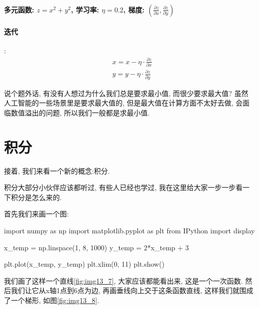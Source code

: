 \paragraph{多元函数: $z = x^2 + y ^2$, 学习率: $\eta = 0.2$, 梯度: $(\frac{\partial z}{\partial x}, \frac{\partial z}{\partial y})$}
\paragraph{迭代}:
\begin{align*}
  & x = x - \eta \cdot \frac{\partial z}{\partial x} \\
  & y = y - \eta \cdot \frac {\partial z}{\partial y}
\end{align*}

说个题外话, 有没有人想过为什么我们总是要求最小值, 而很少要求最大值? 虽然人工智能的一些场景里是要求最大值的, 但是最大值在计算方面不太好去做, 会面临数值溢出的问题, 所以我们一般都是求最小值. 

\section{积分}

接着, 我们来看一个新的概念:积分. 

积分大部分小伙伴应该都听过, 有些人已经也学过, 我在这里给大家一步一步看一下积分是怎么来的. 

首先我们来画一个图:

\begin{python}
import numpy as np
import matplotlib.pyplot as plt
from IPython import display

x_temp = np.linspace(1, 8, 1000)
y_temp = 2*x_temp + 3


plt.plot(x_temp, y_temp)
plt.xlim(0, 11)
plt.show()
\end{python}

我们画了这样一个直线\ref{fig:img13_7}, 大家应该都能看出来, 这是一个一次函数. 然后我们让它从x轴1点到6点为边, 再画垂线向上交于这条函数直线, 这样我们就围成了一个梯形, 如图\ref{fig:img13_8}.

